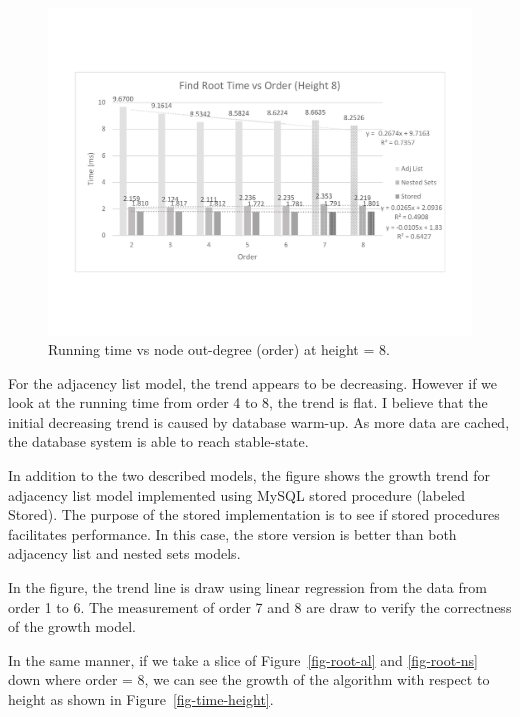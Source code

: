 \begin{figure}[!h]
\begin{center}
\includegraphics[width=6in]{images/order.pdf}
\caption{Running time vs node out-degree (order) at height = 8.\label{fig-time-order}}
\end{center}
\end{figure}

For the adjacency list model, the trend appears to be decreasing. However if we look at the running time from order 4 to 8, the trend is flat. I believe that the initial decreasing trend is caused by database warm-up. As more data are cached, the database system is able to reach stable-state.

In addition to the two described models, the figure shows the growth trend for adjacency list model implemented using MySQL stored procedure (labeled Stored). The purpose of the stored implementation is to see if stored procedures facilitates performance. In this case, the store version is better than both adjacency list and nested sets models.

In the figure, the trend line is draw using linear regression from the data from order 1 to 6. The measurement of order 7 and 8 are draw to verify the correctness of the growth model.

In the same manner, if we take a slice of Figure~\ref{fig-root-al} and \ref{fig-root-ns} down where order = 8, we can see the growth of the algorithm with respect to height as shown in Figure~\ref{fig-time-height}.

